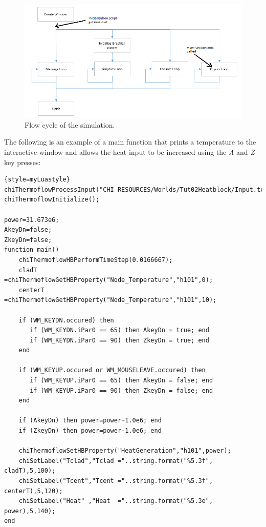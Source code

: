 \documentclass[11pt,letterpaper,titlepage]{article}
\begin{document}
\noindent
	\begin{center}
		\begin{minipage}[c]{0.85\textwidth}
	
			\begin{figure}[H]
			
				\includegraphics[width=6in]{CycleIntercept.png}
				\caption{Flow cycle of the simulation.}
				\label{figure:CycleIntercept}
			\end{figure}
		\end{minipage}
	\end{center}
\vspace{0.5cm}
The following is an example of a main function that prints a temperature to the interactive window and allows the heat input to be increased using the \textit{A} and \textit{Z} key presses:
\newline
\noindent
\begin{lstlisting}{style=myLuastyle}
chiThermoflowProcessInput("CHI_RESOURCES/Worlds/Tut02Heatblock/Input.txt");
chiThermoflowInitialize();

power=31.673e6;
AkeyDn=false;
ZkeyDn=false;
function main()
    chiThermoflowHBPerformTimeStep(0.0166667);
    cladT     =chiThermoflowGetHBProperty("Node_Temperature","h101",0);
    centerT   =chiThermoflowGetHBProperty("Node_Temperature","h101",10);

    if (WM_KEYDN.occured) then
       if (WM_KEYDN.iPar0 == 65) then AkeyDn = true; end
       if (WM_KEYDN.iPar0 == 90) then ZkeyDn = true; end
    end
    
    if (WM_KEYUP.occured or WM_MOUSELEAVE.occured) then
       if (WM_KEYUP.iPar0 == 65) then AkeyDn = false; end
       if (WM_KEYUP.iPar0 == 90) then ZkeyDn = false; end
    end
    
    if (AkeyDn) then power=power+1.0e6; end
    if (ZkeyDn) then power=power-1.0e6; end
    
    chiThermoflowSetHBProperty("HeatGeneration","h101",power);
    chiSetLabel("Tclad","Tclad ="..string.format("%5.3f", cladT),5,100);
    chiSetLabel("Tcent","Tcent ="..string.format("%5.3f", centerT),5,120);
    chiSetLabel("Heat" ,"Heat  ="..string.format("%5.3e", power),5,140);
end
\end{lstlisting}
\end{document}
